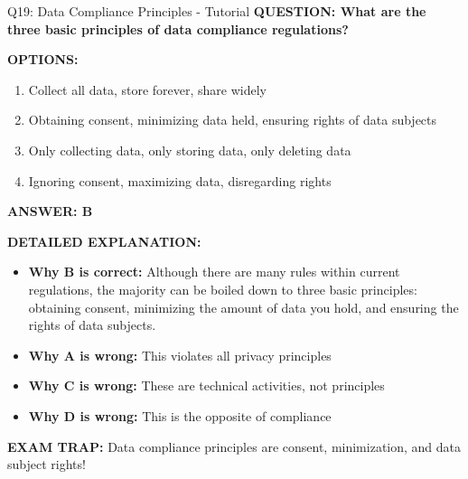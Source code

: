\documentclass[8pt]{beamer}
\begin{document}
	\begin{frame}{Q19: Data Compliance Principles - Tutorial}
		\fontsize{6.5}{7.5}\selectfont
		\textbf{QUESTION: What are the three basic principles of data compliance regulations?}
		
		\vspace{0.1cm}
		\textbf{OPTIONS:}
		\begin{enumerate}
			\item Collect all data, store forever, share widely
			\item Obtaining consent, minimizing data held, ensuring rights of data subjects
			\item Only collecting data, only storing data, only deleting data
			\item Ignoring consent, maximizing data, disregarding rights
		\end{enumerate}
		
		\vspace{0.1cm}
		\textcolor{myblue}{\textbf{ANSWER: B}}
		
		\vspace{0.1cm}
		\textbf{DETAILED EXPLANATION:}
		\begin{itemize}
			\item \textbf{Why B is correct:} Although there are many rules within current regulations, the majority can be boiled down to three basic principles: obtaining consent, minimizing the amount of data you hold, and ensuring the rights of data subjects.
			\item \textbf{Why A is wrong:} This violates all privacy principles
			\item \textbf{Why C is wrong:} These are technical activities, not principles
			\item \textbf{Why D is wrong:} This is the opposite of compliance
		\end{itemize}
		
		\textcolor{myred}{\textbf{EXAM TRAP:}} Data compliance principles are \textcolor{myblue}{consent, minimization, and data subject rights}!
	\end{frame}
	
\end{document}
